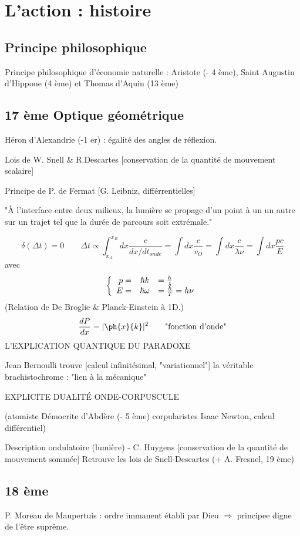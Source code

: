 \section{L'action : histoire}


\subsection{Principe philosophique}
Principe philosophique d'économie naturelle : Aristote (- 4 ème), Saint
Augustin d'Hippone (4 ème) et Thomas d'Aquin (13 ème)
\subsection{17 ème Optique géométrique}
Héron d'Alexandrie (-1 er) : égalité des angles de réflexion.

Lois de W. Snell \& R.Descartes [conservation de la quantité de mouvement
scalaire]

Principe de P. de Fermat [G. Leibniz, différrentielles]

"À l'interface entre deux milieux, la lumière se propage d'un point à un un
autre sur un trajet tel que la durée de parcours soit extrémale."

\[
\delta(\Delta t)=0 \qquad \Delta t \propto \int^{x_B}_{x_A}dx
\frac{c}{dx/dt_{onde}} = \int dx \frac{c}{v_O} =
\int dx \frac{c}{\lambda\nu} = \int dx \frac{pc}{E}
\]
avec
\[
\left\{
\begin{array}{ r c l }
 p= & \hbar k & = \frac{h}{\lambda} \\
 E= & \hbar \omega & = \frac{h}{T} = h\nu \\
\end{array}
\right .
\]
(Relation de De Broglie \& Planck-Einstein à 1D.)
\[%
\frac{dP}{dx}=|\ph{x}{k}|^2 \qquad \text{"fonction d'onde"}
\]
L'EXPLICATION QUANTIQUE DU PARADOXE



Jean Bernoulli trouve [calcul infinitésimal, "variationnel"] la véritable
brachistochrome : "lien à la mécanique"

EXPLICITE DUALITÉ ONDE-CORPUSCULE

(atomiste Démocrite d'Abdère (- 5 ème) corpularistes Isaac Newton,
calcul différentiel)

Description ondulatoire (lumière) - C. Huygens [conservation de la quantité
de mouvement sommée] Retrouve les lois de Snell-Descartes (+ A. Fresnel,
19 ème)
\subsection{18 ème}
P. Moreau de Maupertuis : ordre immanent établi par Dieu $\Rightarrow$ principee digne de l'être suprême.

